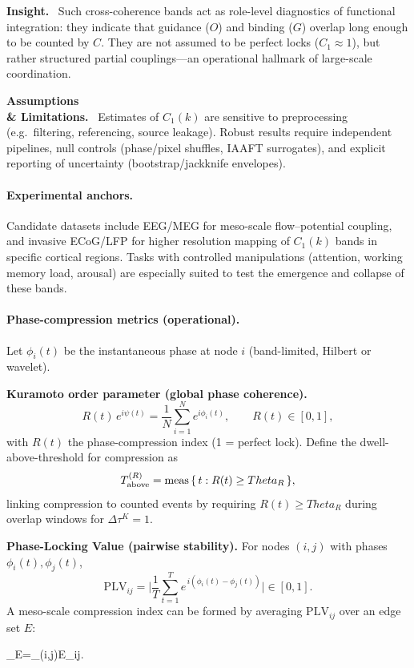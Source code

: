 \documentclass[12pt,a4paper,oneside]{scrreprt}
\def\Theta{Theta}%
\def\;{}%
\def\({}%
\def\){}%
\newenvironment{insight}{\par\vspace{0.5em}\noindent\textbf{Insight.}\ }{\par\vspace{0.5em}}
\newenvironment{limitation}{\par\vspace{0.5em}\noindent\textbf{Assumptions \\ \& Limitations.}\ }{\par\vspace{0.5em}}
\begin{document}
\begin{insight}
Such cross-coherence bands act as role-level diagnostics of functional integration: 
they indicate that guidance ($O$) and binding ($G$) overlap long enough to be counted by $C$. 
They are not assumed to be perfect locks ($C_1\!\approx\!1$), but rather structured partial couplings—an operational hallmark of large-scale coordination.
\end{insight}

\begin{limitation}
Estimates of $C_1(k)$ are sensitive to preprocessing (e.g.\ filtering, referencing, source leakage). 
Robust results require independent pipelines, null controls (phase/pixel shuffles, IAAFT surrogates), and explicit reporting of uncertainty (bootstrap/jackknife envelopes).
\end{limitation}

\paragraph{Experimental anchors.}
Candidate datasets include EEG/MEG for meso-scale flow–potential coupling, and invasive ECoG/LFP for higher resolution mapping of $C_1(k)$ bands in specific cortical regions. 
Tasks with controlled manipulations (attention, working memory load, arousal) are especially suited to test the emergence and collapse of these bands.

\paragraph{Phase-compression metrics (operational).}
Let $\phi_i(t)$ be the instantaneous phase at node $i$ (band-limited, Hilbert or wavelet). 

\textbf{Kuramoto order parameter (global phase coherence).}
\begin{equation}
R(t)\,e^{i\psi(t)} \;=\; \frac{1}{N}\sum_{i=1}^{N} e^{i\phi_i(t)}, 
\qquad R(t)\in[0,1],
\end{equation}
with $R(t)$ the phase-compression index (1 = perfect lock). 
Define the dwell-above-threshold for compression as
\begin{equation}
T_{\rm above}^{(R)} \;=\; \text{meas}\,\{\,t: R(t) \ge \Theta_R\,\},
\end{equation}
linking compression to counted events by requiring $R(t)\!\ge\!\Theta_R$ during overlap windows for $\Delta\tau^K=1$.

\textbf{Phase-Locking Value (pairwise stability).}
For nodes $(i,j)$ with phases $\phi_i(t),\phi_j(t)$,
\begin{equation}
\mathrm{PLV}_{ij} \;=\; \Big|\frac{1}{T}\sum_{t=1}^{T} 
e^{\,i(\phi_i(t)-\phi_j(t))}\Big| \;\in\;[0,1].
\end{equation}
A meso-scale compression index can be formed by averaging $\mathrm{PLV}_{ij}$ over an edge set $E$:
\(
_E=\sum_{(i,j)\in E}_{ij}.
\)
\end{document}
